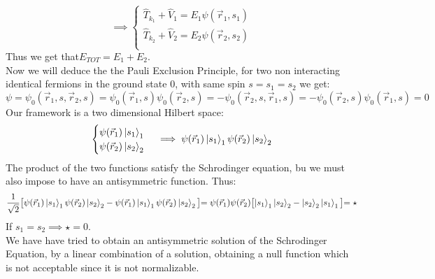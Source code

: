 \documentclass{article}
\begin{document}
$$ \implies \begin{cases}
     \hat{T}_{k_1}+ \hat{V}_1 = E_1\psi(\vec{r}_1,s_1) \\
     \hat{T}_{k_2}+ \hat{V}_2 = E_2\psi(\vec{r}_2,s_2) \\
\end{cases}$$
Thus we get that$E_{TOT} = E_1+ E_2$. \\
Now we will deduce the the Pauli Exclusion Principle, for two non interacting identical fermions in the ground state $0$, with same spin $s=s_1=s_2$ we get:
$$\psi = \psi_0(\vec{r}_1,s,\vec{r}_2,s)= \psi_0(\vec{r}_1,s)\psi_0(\vec{r}_2,s)= -\psi_0(\vec{r}_2,s,\vec{r}_1,s) = -  \psi_0(\vec{r}_2,s)\psi_0(\vec{r}_1,s)=0$$
Our framework is a two dimensional Hilbert space:
$$
\begin{cases}
\psi(\vec{r}_1)\ket{s_1}_1\\
\psi(\vec{r}_2)\ket{s_2}_2\\
\end{cases} \implies \psi(\vec{r}_1)\ket{s_1}_1\psi(\vec{r}_2)\ket{s_2}_2
$$
The product of the two functions satisfy the Schrodinger equation, bu we must also impose to have an antisymmetric function. Thus:
$$\frac{1}{\sqrt{2}}\bigl[\psi(\vec{r}_1)\ket{s_1}_1\psi(\vec{r}_2)\ket{s_2}_2-\psi(\vec{r}_1)\ket{s_1}_1\psi(\vec{r}_2)\ket{s_2}_2\bigl] =\psi(\vec{r}_1)\psi(\vec{r}_2) \bigl[ \ket{s_1}_1\ket{s_2}_2-\ket{s_2}_2\ket{s_1}_1 \bigl] = \star $$
If $s_1=s_2 \implies \star = 0 $.\\
We have have tried to obtain an antisymmetric solution of the Schrodinger Equation, by a linear combination of a solution, obtaining a null function which is not acceptable since it is not normalizable.
\end{document}
